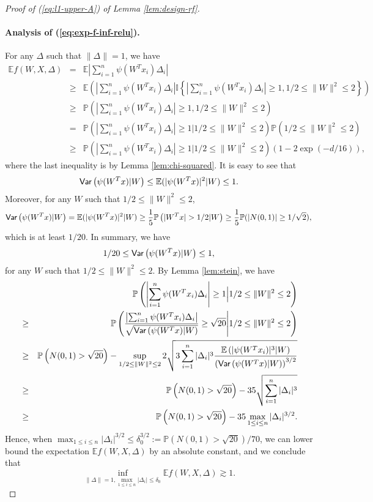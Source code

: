 \begin{proof}[Proof of (\ref{eq:l1-upper-A}) of Lemma \ref{lem:design-rf}]
\paragraph{Analysis of (\ref{eq:exp-f-inf-relu}).} For any $\Delta$ such that $\|\Delta\|=1$, we have
\begin{eqnarray}
\nonumber \mathbb{E}f(W,X,\Delta) &=& \mathbb{E}\left|\sum_{i=1}^n\psi(W^Tx_i)\Delta_i\right| \\
\nonumber &\geq& \mathbb{E}\left(\left|\sum_{i=1}^n\psi(W^Tx_i)\Delta_i\right|\mathbb{I}\left\{\left|\sum_{i=1}^n\psi(W^Tx_i)\Delta_i\right|\geq 1, 1/2\leq \|W\|^2\leq 2\right\}\right) \\
\nonumber &\geq& \mathbb{P}\left(\left|\sum_{i=1}^n\psi(W^Tx_i)\Delta_i\right|\geq 1, 1/2\leq \|W\|^2\leq 2\right) \\
\nonumber &=& \mathbb{P}\left(\left|\sum_{i=1}^n\psi(W^Tx_i)\Delta_i\right|\geq 1\Big|1/2\leq \|W\|^2\leq 2\right)\mathbb{P}\left(1/2\leq \|W\|^2\leq 2\right) \\
\nonumber &\geq& \mathbb{P}\left(\left|\sum_{i=1}^n\psi(W^Tx_i)\Delta_i\right|\geq 1\Big|1/2\leq \|W\|^2\leq 2\right)\left(1-2\exp(-d/16)\right),
\end{eqnarray}
where the last inequality is by Lemma \ref{lem:chi-squared}. It is easy to see that $$\textsf{Var}\left(\psi(W^Tx)|W\right)\leq \mathbb{E}(|\psi(W^Tx)|^2|W)\leq 1.$$
Moreover, for any $W$ such that $1/2\leq \|W\|^2\leq 2$,
$$\Var\left(\psi(W^Tx)|W\right)= \mathbb{E}(|\psi(W^Tx)|^2|W) \geq \frac{1}{5}\mathbb{P}\left(|W^Tx|>1/2|W\right)\geq \frac{1}{5}\mathbb{P}(|N(0,1)|\geq 1/\sqrt{2}),$$
which is at least $1/20$. In summary, we have
$$1/20 \leq \textsf{Var}\left(\psi(W^Tx)|W\right) \leq 1,$$
for any $W$ such that $1/2\leq \|W\|^2\leq 2$.
By Lemma \ref{lem:stein}, we have
\begin{eqnarray}
\nonumber && \mathbb{P}\left(\left|\sum_{i=1}^n\psi(W^Tx_i)\Delta_i\right|\geq 1\Big|1/2\leq \|W\|^2\leq 2\right) \\
\nonumber &\geq& \mathbb{P}\left(\frac{\left|\sum_{i=1}^n\psi(W^Tx_i)\Delta_i\right|}{\sqrt{\Var\left(\psi(W^Tx)|W\right)}}\geq \sqrt{20}\Bigg|1/2\leq \|W\|^2\leq 2\right) \\
\nonumber &\geq& \mathbb{P}\left(N(0,1)>\sqrt{20}\right) - \sup_{1/2\leq \|W\|^2\leq 2} 2\sqrt{3\sum_{i=1}^n|\Delta_i|^3\frac{\mathbb{E}\left(|\psi(W^Tx_i)|^3|W\right)}{\left(\Var\left(\psi(W^Tx)|W\right)\right)^{3/2}}} \\
\nonumber &\geq& \mathbb{P}\left(N(0,1)>\sqrt{20}\right) - 35\sqrt{\sum_{i=1}^n|\Delta_i|^3} \\
\nonumber &\geq& \mathbb{P}\left(N(0,1)>\sqrt{20}\right) - 35\max_{1\leq i\leq n}|\Delta_i|^{3/2}.
\end{eqnarray}
Hence, when $\max_{1\leq i\leq n}|\Delta_i|^{3/2}\leq \delta_0^{3/2}:=\mathbb{P}\left(N(0,1)>\sqrt{20}\right)/70$, we can lower bound the expectation $\mathbb{E}f(W,X,\Delta)$ by an absolute constant, and we conclude that
\begin{equation}
\inf_{\|\Delta\|=1, \max_{1\leq i\leq n}|\Delta_i|\leq\delta_0}\mathbb{E}f(W,X,\Delta) \gtrsim 1.\label{appeq:l1-1-2}
\end{equation}


\end{proof}
